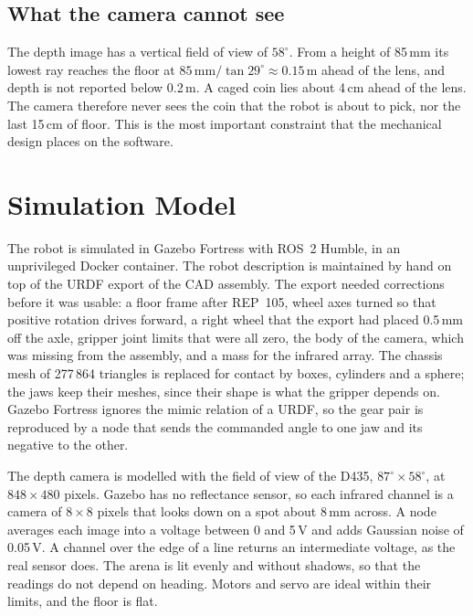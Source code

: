 \documentclass[conference,a4paper]{IEEEtran}
\newcommand{\unit}[1]{\ensuremath{\,\mathrm{#1}}}
\begin{document}
\subsection{What the camera cannot see}
The depth image has a vertical field of view of $58^\circ$. From a height of 85\unit{mm} its
lowest ray reaches the floor at $85\unit{mm}/\tan 29^\circ\approx0.15\unit{m}$ ahead of the
lens, and depth is not reported below 0.2\unit{m}. A caged coin lies about 4\unit{cm} ahead
of the lens. The camera therefore never sees the coin that the robot is about to pick, nor
the last 15\unit{cm} of floor. This is the most important constraint that the mechanical
design places on the software.

\section{Simulation Model}
\label{sec:sim}
The robot is simulated in Gazebo Fortress with ROS~2 Humble, in an unprivileged Docker
container. The robot description is maintained by hand on top of the URDF export of the CAD
assembly. The export needed corrections before it was usable: a floor frame after
REP~105, wheel axes turned so that positive rotation drives forward, a right wheel that
the export had placed 0.5\unit{mm} off the axle, gripper joint limits that were all zero,
the body of the camera, which was missing from the assembly, and a mass for the infrared
array. The chassis mesh of 277\,864 triangles is replaced for contact by boxes, cylinders
and a sphere; the jaws keep their meshes, since their shape is what the gripper depends on.
Gazebo Fortress ignores the mimic relation of a URDF, so the gear pair is reproduced by a
node that sends the commanded angle to one jaw and its negative to the other.

The depth camera is modelled with the field of view of the D435, $87^\circ\times58^\circ$,
at $848\times480$ pixels. Gazebo has no reflectance sensor, so each infrared channel is a
camera of $8\times8$ pixels that looks down on a spot about 8\unit{mm} across. A node
averages each image into a voltage between 0 and 5\unit{V} and adds Gaussian noise of
0.05\unit{V}. A channel over the edge of a line returns an intermediate voltage, as the
real sensor does. The arena is lit evenly and without shadows, so that the readings do not
depend on heading. Motors and servo are ideal within their limits, and the floor is flat.
\end{document}
